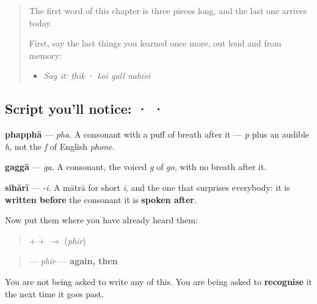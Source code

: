 \label{lesson:PA-S04-phappha-gagga}



\begin{quote}
The first word of this chapter is three pieces long, and the last one arrives today.

First, say the last things you learned once more, out loud and from memory:

\begin{itemize}
\raggedright
  \item \emph{Say it:} \emph{ṭhīk} · \emph{koī gall nahīṁ}
\end{itemize}
\end{quote}

\subsection*{Script you'll notice:  ·  · }
\begin{quote}
\end{quote}

\textbf{phapphā} — \emph{pha}. A consonant with a puff of breath after it — \emph{p} plus an audible \emph{h}, not the \emph{f} of English \emph{phone}.

\begin{quote}
\end{quote}

\textbf{gaggā} — \emph{ga}. A consonant, the voiced \emph{g} of \emph{go}, with no breath after it.

\begin{quote}
\end{quote}

\textbf{sihārī} — \emph{-i}. A mātrā for short \emph{i}, and the one that surprises everybody: it is \textbf{written before} the consonant it is \textbf{spoken after}.

Now put them where you have already heard them:

\begin{quote}
\textbf{} + \textbf{} + \textbf{} $\to$ \textbf{} (\emph{phir})
\end{quote}

\begin{quote}
\textbf{} — \emph{phir} — \textbf{again, then}
\end{quote}

You are not being asked to write any of this. You are being asked to \textbf{recognise} it the next time it goes past.

